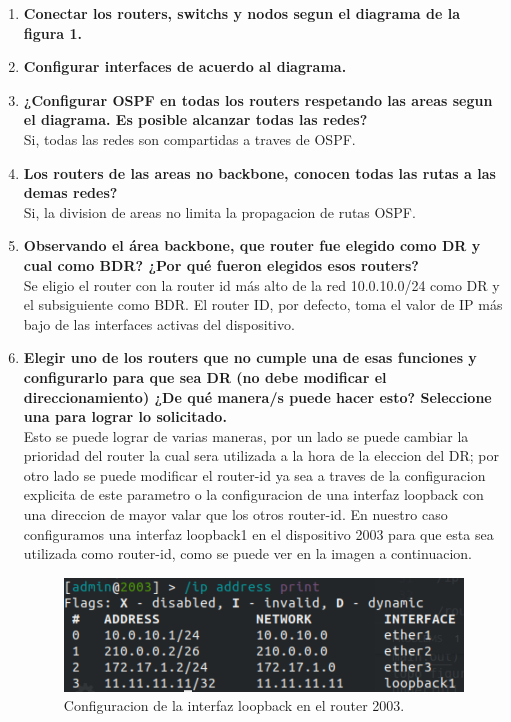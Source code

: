 \documentclass[letterpaper,12pt]{article}
\begin{document}
	\begin{enumerate}
		\item \textbf{Conectar los routers, switchs y nodos segun el diagrama de la figura 1.}
		\item \textbf{Configurar interfaces de acuerdo al diagrama.}
		\item \textbf{¿Configurar OSPF en todas los routers respetando las areas segun el diagrama. Es posible alcanzar todas las redes?} \\
		Si, todas las redes son compartidas a traves de OSPF.
		\item \textbf{Los routers de las areas no backbone, conocen todas las rutas a las demas redes?}\\
		Si, la division de areas no limita la propagacion de rutas OSPF.
		\item \textbf{Observando el área backbone, que router fue elegido como DR y cual como BDR? ¿Por qué fueron elegidos esos routers?}\\
		Se eligio el router con la router id más alto de la red 10.0.10.0/24 como DR y el subsiguiente como BDR. El router ID, por defecto, toma el valor de IP más bajo de las interfaces activas del dispositivo.
		\item \textbf{Elegir uno de los routers que no cumple una de esas funciones y configurarlo para que sea DR (no debe modificar el direccionamiento) ¿De qué manera/s puede hacer esto? Seleccione una para lograr lo solicitado.}\\
		Esto se puede lograr de varias maneras, por un lado se puede cambiar la prioridad del router la cual sera utilizada a la hora de la eleccion del DR; por otro lado se puede modificar el router-id ya sea a traves de la configuracion explicita de este parametro o la configuracion de una interfaz loopback con una direccion de mayor valar que los otros router-id. En nuestro caso configuramos una interfaz loopback1 en el dispositivo 2003 para que esta sea utilizada como router-id, como se puede ver en la imagen a continuacion.
		\begin{figure}[H] 
			
			\centering \includegraphics[width=0.5\columnwidth]{figure/int_loopback.png}
			\caption{
					\label{fig:samplesetup} %
					Configuracion de la interfaz loopback en el router 2003.
			}
		\end{figure} 
		\begin{figure}[H] 
			

\end{figure}
\end{enumerate}
\end{document}
